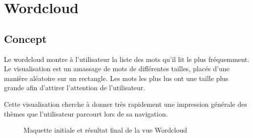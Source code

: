 
%
%
%
%

\section{Wordcloud}

	\subsection{Concept}

		Le wordcloud montre à l'utilisateur la liste des mots qu'il lit le plus fréquemment. Le visualisation est un amassage de mots de différentes tailles, placés d'une manière aléatoire sur un rectangle. Les mots les plus lus ont une taille plus grande afin d'attirer l'attention de l'utilisateur.

		Cette visualisation cherche à donner très rapidement une impression générale des thèmes que l'utilisateur parcourt lors de sa navigation.

		\begin{figure}[!h]
			\centering
			\caption{Maquette initiale et résultat final de la vue Wordcloud}
			\label{wordcloud_images}
		\end{figure}

